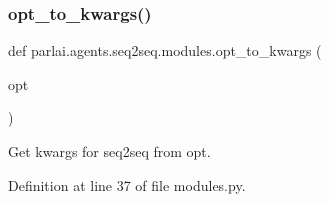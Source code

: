 \subsubsection{\texorpdfstring{opt\+\_\+to\+\_\+kwargs()}{opt\_to\_kwargs()}}
{\footnotesize\ttfamily def parlai.\+agents.\+seq2seq.\+modules.\+opt\+\_\+to\+\_\+kwargs (\begin{DoxyParamCaption}\item[{}]{opt }\end{DoxyParamCaption})}

\begin{DoxyVerb}Get kwargs for seq2seq from opt.\end{DoxyVerb}
 

Definition at line 37 of file modules.\+py.


